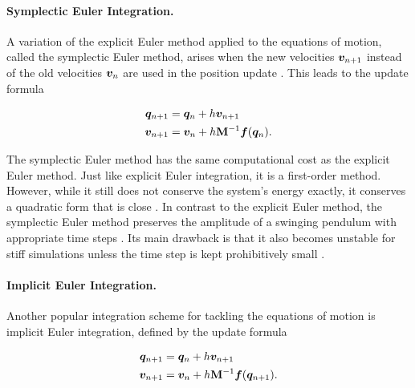 \paragraph{Symplectic Euler Integration.}
A variation of the explicit Euler method applied to the equations of motion, called the symplectic Euler method, arises when the new 
velocities $\bm{v}_{n+1}$ instead of the old velocities $\bm{v}_n$ are used in the position update \cite{stern2006}. This leads to 
the update formula

\begin{align}
    \begin{split}\label{eq:symplectic-euler}
        \bm{q}_{n+1} &= \bm{q}_n + h\bm{v}_{n+1}\\
        \bm{v}_{n+1} &= \bm{v}_n + h\mathbf{M}^{-1}\bm{f}(\bm{q}_n).
    \end{split}
\end{align}

\noindent The symplectic Euler method has the same computational cost as the explicit Euler method. Just like explicit Euler integration, it 
is a first-order method. However, while it still does not conserve the system's energy exactly, it conserves a quadratic form that is close 
\cite{servin2006}. In contrast to the explicit Euler method, the symplectic Euler method preserves the amplitude of a swinging pendulum with 
appropriate time steps \cite{stern2006}. Its main drawback is that it also becomes unstable for stiff simulations unless the time step is 
kept prohibitively small \cite{servin2006}. 

\paragraph{Implicit Euler Integration.}
Another popular integration scheme for tackling the equations of motion is implicit Euler integration, defined by the update formula

\begin{align}
    \begin{split}\label{eq:implicit-euler}
        \bm{q}_{n+1} &= \bm{q}_n + h\bm{v}_{n+1}\\
        \bm{v}_{n+1} &= \bm{v}_n + h\mathbf{M}^{-1}\bm{f}(\bm{q}_{n+1}).
    \end{split}
\end{align}


